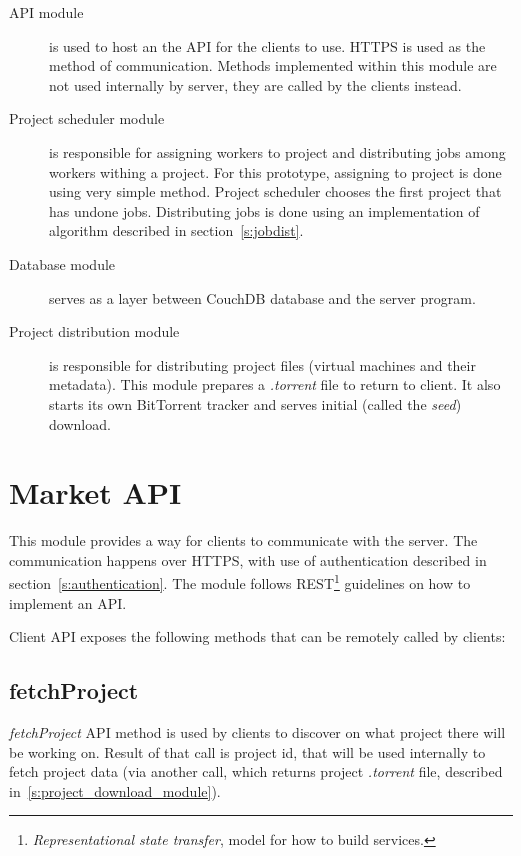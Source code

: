 \begin{description}

\item[API module] is used to host an the API for the clients to use. HTTPS is used as the method of communication. Methods implemented within this module are not used internally by server, they are called by the clients instead.

\item[Project scheduler module] is responsible for assigning workers to project and distributing jobs among workers withing a project. For this prototype, assigning to project is done using very simple method. Project scheduler chooses the first project that has undone jobs. Distributing jobs is done using an implementation of algorithm described in section~\ref{s:jobdist}.

\item[Database module] serves as a layer between CouchDB database and the server program.

\item[Project distribution module] is responsible for distributing project files (virtual machines and their metadata). This module prepares a \emph{.torrent} file to return to client. It also starts its own BitTorrent tracker and serves initial (called the \emph{seed}) download.

\end{description}

\section{Market API}
\label{s:cliapi}

This module provides a way for clients to communicate with the server. The communication happens over HTTPS, with use of authentication described in section~\ref{s:authentication}. The module follows REST\footnote{\emph{Representational state transfer}, model for how to build services.} guidelines on how to implement an API.

Client API exposes the following methods that can be remotely called by clients:

\subsection{fetchProject}

\emph{fetchProject} API method is used by clients to discover on what project there will be working on. Result of that call is project id, that will be used internally to fetch project data (via another call, which returns project \emph{.torrent} file, described in~\ref{s:project_download_module}).

